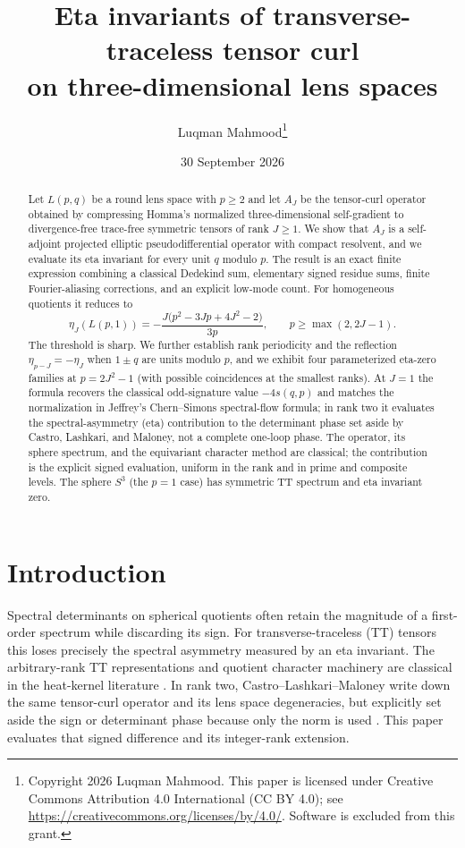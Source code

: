 \documentclass[11pt]{article}
\title{Eta invariants of transverse-traceless tensor curl\\
on three-dimensional lens spaces}
\author{Luqman Mahmood\thanks{Copyright 2026 Luqman Mahmood. This paper is licensed under Creative Commons Attribution 4.0 International (CC BY 4.0); see \url{https://creativecommons.org/licenses/by/4.0/}. Software is excluded from this grant.}}
\date{30 September 2026}
\theoremstyle{definition}
\begin{document}
\maketitle

\begin{abstract}
Let $L(p,q)$ be a round lens space with $p\geq2$ and let $A_J$ be the
tensor-curl operator obtained by compressing Homma's normalized
three-dimensional self-gradient to divergence-free trace-free symmetric
tensors of rank $J\geq1$.  We show that $A_J$ is a self-adjoint projected
elliptic pseudodifferential operator with compact resolvent, and we evaluate
its eta invariant for every unit $q$ modulo $p$.  The result is an exact
finite expression combining a classical Dedekind sum, elementary signed
residue sums, finite Fourier-aliasing corrections, and an explicit low-mode
count.  For homogeneous quotients it reduces to
\[
 \eta_J(L(p,1))
 =-\frac{J\bigl(p^2-3Jp+4J^2-2\bigr)}{3p},
 \qquad p\geq\max(2,2J-1).
\]
The threshold is sharp.  We further establish rank periodicity and the
reflection $\eta_{p-J}=-\eta_J$ when $1\pm q$ are units modulo $p$, and we
exhibit four parameterized eta-zero families at $p=2J^2-1$ (with possible
coincidences at the smallest ranks).  At $J=1$ the formula recovers the
classical odd-signature value $-4s(q,p)$ and matches the normalization in
Jeffrey's Chern--Simons spectral-flow formula; in rank two it evaluates the
spectral-asymmetry (eta) contribution to the determinant phase set aside by
Castro, Lashkari, and Maloney, not a complete one-loop phase.  The operator,
its sphere spectrum, and the equivariant character method are classical; the
contribution is the explicit signed evaluation, uniform in the rank and in
prime and composite levels.  The sphere $S^3$ (the $p=1$ case) has symmetric
TT spectrum and eta invariant zero.
\end{abstract}

\section{Introduction}

Spectral determinants on spherical quotients often retain the magnitude of a
first-order spectrum while discarding its sign.  For transverse-traceless
(TT) tensors this loses precisely the spectral asymmetry measured by an eta
invariant.  The arbitrary-rank TT representations and quotient character
machinery are classical in the heat-kernel literature
\cite{DavidGaberdielGopakumar2010}.  In rank two,
Castro--Lashkari--Maloney write down the same tensor-curl operator and its lens
space degeneracies, but explicitly set aside the sign or determinant phase
because only the norm is used \cite[eqs.~(3.3), (3.13)--(3.18) and footnote~5]
{CastroLashkariMaloney2011}.  This paper evaluates that signed difference and
its integer-rank extension.
\end{document}
